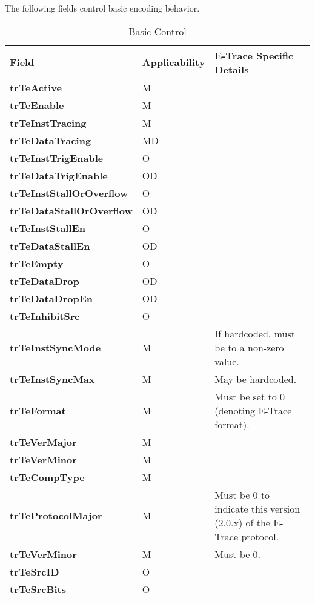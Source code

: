 The following fields control basic encoding behavior.

\begin{table}[htp]
  \centering
  \caption{Basic Control}
  \label{tab:ctl-basic}
  \begin{tabulary}{\textwidth}{|l|l|p{90mm}|}
    \hline
    {\bf Field} & {\bf Applicability} & {\bf E-Trace Specific Details} \\
    \hline
    \textbf{trTeActive} & M & \\
    \hline
    \textbf{trTeEnable} & M & \\
    \hline
    \textbf{trTeInstTracing} & M & \\
    \hline
    \textbf{trTeDataTracing} & MD & \\
    \hline
    \textbf{trTeInstTrigEnable} & O & \\
    \hline
    \textbf{trTeDataTrigEnable} & OD & \\
    \hline
    \textbf{trTeInstStallOrOverflow} & O & \\
    \hline
    \textbf{trTeDataStallOrOverflow} & OD & \\
    \hline
    \textbf{trTeInstStallEn} & O & \\
    \hline
    \textbf{trTeDataStallEn} & OD & \\
    \hline
    \textbf{trTeEmpty} & O & \\
    \hline
    \textbf{trTeDataDrop} & OD & \\
    \hline
    \textbf{trTeDataDropEn} & OD & \\
    \hline
    \textbf{trTeInhibitSrc} & O & \\
    \hline
    \textbf{trTeInstSyncMode} & M & If hardcoded, must be to a non-zero value. \\
    \hline
    \textbf{trTeInstSyncMax} & M & May be hardcoded.\\
    \hline
    \textbf{trTeFormat} & M & Must be set to 0 (denoting E-Trace format).\\
    \hline
    \textbf{trTeVerMajor} & M & \\
    \hline
    \textbf{trTeVerMinor} & M & \\
    \hline
    \textbf{trTeCompType} & M & \\
    \hline
    \textbf{trTeProtocolMajor} & M & Must be 0 to indicate this version (2.0.x) of the E-Trace protocol.\\
    \hline
    \textbf{trTeVerMinor} & M & Must be 0.\\
    \hline
    \textbf{trTeSrcID} & O & \\
    \hline
    \textbf{trTeSrcBits} & O & \\
    \hline
  \end{tabulary}
\end{table}

